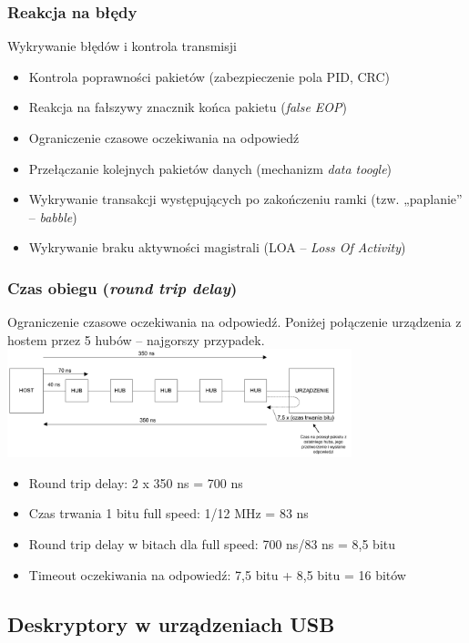 	\subsubsection{Reakcja na błędy}
	Wykrywanie błędów i kontrola transmisji\\
	\begin{itemize}
		\item Kontrola poprawności pakietów (zabezpieczenie pola PID, CRC)
		\item Reakcja na fałszywy znacznik końca pakietu (\emph{false EOP})
		\item Ograniczenie czasowe oczekiwania na odpowiedź
		\item Przełączanie kolejnych pakietów danych (mechanizm \emph{data toogle})
		\item Wykrywanie transakcji występujących po zakończeniu ramki (tzw. „paplanie” – \emph{babble})
		\item Wykrywanie braku aktywności magistrali (LOA – \emph{Loss Of Activity})
	\end{itemize}
	\subsubsection{Czas obiegu (\emph{round trip delay})}
	Ograniczenie czasowe oczekiwania na odpowiedź. Poniżej połączenie urządzenia z hostem przez 5 hubów – najgorszy przypadek.\\
	\includegraphics[width=10cm]{./wyklady/USB_23_1.pdf}
	\begin{itemize}
		\item Round trip delay: 2 x 350 ns = 700 ns
		\item Czas trwania 1 bitu full speed: 1/12 MHz = 83 ns
		\item Round trip delay w bitach dla full speed: 700 ns/83 ns = 8,5 bitu
		\item Timeout oczekiwania na odpowiedź: 7,5 bitu + 8,5 bitu = 16 bitów
	\end{itemize}
	
\subsection{Deskryptory w urządzeniach USB}
